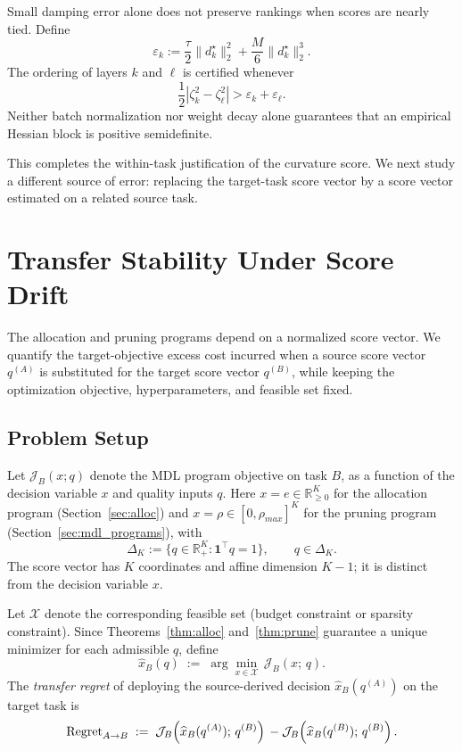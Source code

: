 \documentclass[accepted]{uai2026}%
\theoremstyle{remark}%
\begin{document}
Small damping error alone does not preserve rankings when scores are nearly
tied. Define
\[
\varepsilon_k
:=
\frac{\tau}{2}\|d_k^\star\|_2^2
+
\frac{M}{6}\|d_k^\star\|_2^3.
\]
The ordering of layers $k$ and $\ell$ is certified whenever
\[
\frac12|\zeta_k^2-\zeta_\ell^2|>\varepsilon_k+\varepsilon_\ell.
\]
Neither batch normalization nor weight decay alone guarantees that an
empirical Hessian block is positive semidefinite.

This completes the within-task justification of the curvature score. We next
study a different source of error: replacing the target-task score vector by a
score vector estimated on a related source task.

\section{Transfer Stability Under Score Drift}
\label{sec:transfer}

The allocation and pruning programs depend on a normalized score
vector. We quantify the target-objective excess cost incurred when a source
score vector $q^{(A)}$ is substituted for the target score vector $q^{(B)}$,
while keeping the optimization objective, hyperparameters, and feasible set
fixed.

\subsection{Problem Setup}
Let $\mathcal{J}_B(x; q)$ denote the MDL program objective on task $B$,
as a function of the decision variable $x$ and quality inputs $q$.
Here $x = e \in \mathbb{R}^K_{\ge 0}$ for the allocation program
(Section~\ref{sec:alloc}) and $x = \rho \in [0,\rho_{max}]^K$ for the pruning
program (Section~\ref{sec:mdl_programs}),
with
\[
\Delta_K:=\{q\in\mathbb R_+^K:\mathbf 1^\top q=1\},
\qquad q\in\Delta_K.
\]
The score vector has $K$ coordinates and affine dimension $K-1$; it is
distinct from the decision variable $x$.

Let $\mathcal{X}$ denote the corresponding feasible set
(budget constraint or sparsity constraint).
Since Theorems~\ref{thm:alloc} and~\ref{thm:prune} guarantee
a unique minimizer for each admissible $q$, define
\[
  \widehat{x}_B(q)
  \;:=\;
  \arg\min_{x \in \mathcal{X}}\,\mathcal{J}_B(x;\, q).
\]
The \emph{transfer regret} of deploying the source-derived decision
$\widehat{x}_B(q^{(A)})$ on the target task is
\begin{equation}
  \label{eq:regret}
  \mathrm{Regret}_{A \to B}
  \;:=\;
  \mathcal{J}_B\!\left(\widehat{x}_B(q^{(A)});\, q^{(B)}\right)\\
  -
  \mathcal{J}_B\!\left(\widehat{x}_B(q^{(B)});\, q^{(B)}\right).
\end{equation}
\end{document}
